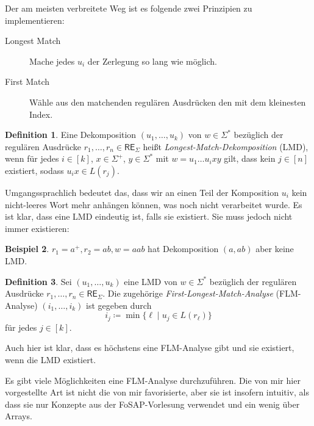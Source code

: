 \documentclass[11pt, a4paper]{article}
\theoremstyle{definition}
\newtheorem{definition}{Definition}[section]
\newtheorem{example}[definition]{Beispiel}
\theoremstyle{plain}
\numberwithin{equation}{section}
\begin{document}
Der am meisten verbreitete Weg ist es folgende zwei Prinzipien zu implementieren:
\begin{description}
	\item[Longest Match] Mache jedes \( u_i \) der Zerlegung so lang wie möglich.
	\item[First Match] Wähle aus den matchenden regulären Ausdrücken den mit dem kleinesten Index.
\end{description}

\begin{definition}
	Eine Dekomposition \( (u_1, \ldots, u_k) \) von \( w \in \Sigma^\ast \) bezüglich der regulären Ausdrücke \( r_1, \ldots, r_n \in \mathsf{RE}_\Sigma \) heißt \textit{Longest-Match-Dekomposition} (LMD), wenn für jedes \( i \in [k] \), \( x \in \Sigma^+ \), \( y \in \Sigma^\ast \) mit \( w = u_1 \ldots u_i x y \) gilt, dass kein \( j \in [n] \) existiert, sodass \( u_i x \in L(r_j) \). 
\end{definition}
Umgangssprachlich bedeutet das, dass wir an einen Teil der Komposition \( u_i \) kein nicht-leeres Wort mehr anhängen können, was noch nicht verarbeitet wurde.
Es ist klar, dass eine LMD eindeutig ist, falls sie existiert. Sie muss jedoch nicht immer existieren:

\begin{example}
	\( r_1 = a^+, r_2 = ab, w = aab \) hat Dekomposition \( (a, ab) \) aber keine LMD.
\end{example}

\begin{definition}
	Sei \( (u_1, \ldots, u_k) \) eine LMD von \( w \in \Sigma^\ast \) bezüglich der regulären Ausdrücke \( r_1, \ldots, r_n \in \mathsf{RE}_\Sigma \). Die zugehörige \textit{First-Longest-Match-Analyse} (FLM-Analyse) \( (i_1, \ldots, i_k) \) ist gegeben durch
	\[
		i_j \coloneqq \min \{ \ell \mid u_j \in L(r_\ell) \}
	\]
	für jedes \( j \in [k] \).
\end{definition}
Auch hier ist klar, dass es höchstens eine FLM-Analyse gibt und sie existiert, wenn die LMD existiert.


Es gibt viele Möglichkeiten eine FLM-Analyse durchzuführen. Die von mir hier vorgestellte Art ist nicht die von mir favorisierte, aber sie ist insofern intuitiv, als dass sie nur Konzepte aus der FoSAP-Vorlesung verwendet und ein wenig über Arrays.
\end{document}
